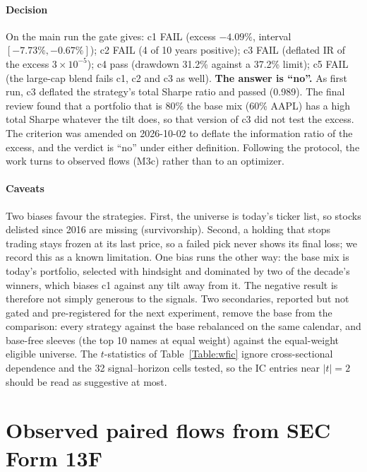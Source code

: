 \documentclass[preprint,3p,twocolumn]{elsarticle}
\begin{document}
\paragraph{Decision} On the main run the gate gives: c1 FAIL (excess $-4.09\%$, interval $[-7.73\%,-0.67\%]$); c2 FAIL (4 of 10 years positive); c3 FAIL (deflated IR of the excess $3\times10^{-5}$); c4 pass (drawdown 31.2\% against a 37.2\% limit); c5 FAIL (the large-cap blend fails c1, c2 and c3 as well). \textbf{The answer is ``no''.} As first run, c3 deflated the strategy's total Sharpe ratio and passed (0.989). The final review found that a portfolio that is 80\% the base mix (60\% AAPL) has a high total Sharpe whatever the tilt does, so that version of c3 did not test the excess. The criterion was amended on 2026-10-02 to deflate the information ratio of the excess, and the verdict is ``no'' under either definition. Following the protocol, the work turns to observed flows (M3c) rather than to an optimizer.

\paragraph{Caveats} Two biases favour the strategies. First, the universe is today's ticker list, so stocks delisted since 2016 are missing (survivorship). Second, a holding that stops trading stays frozen at its last price, so a failed pick never shows its final loss; we record this as a known limitation. One bias runs the other way: the base mix is today's portfolio, selected with hindsight and dominated by two of the decade's winners, which biases c1 against any tilt away from it. The negative result is therefore not simply generous to the signals. Two secondaries, reported but not gated and pre-registered for the next experiment, remove the base from the comparison: every strategy against the base rebalanced on the same calendar, and base-free sleeves (the top 10 names at equal weight) against the equal-weight eligible universe. The $t$-statistics of Table~\ref{Table:wfic} ignore cross-sectional dependence and the 32 signal--horizon cells tested, so the IC entries near $|t|=2$ should be read as suggestive at most.

\section{Observed paired flows from SEC Form 13F}
\label{Section:13f}
\end{document}

